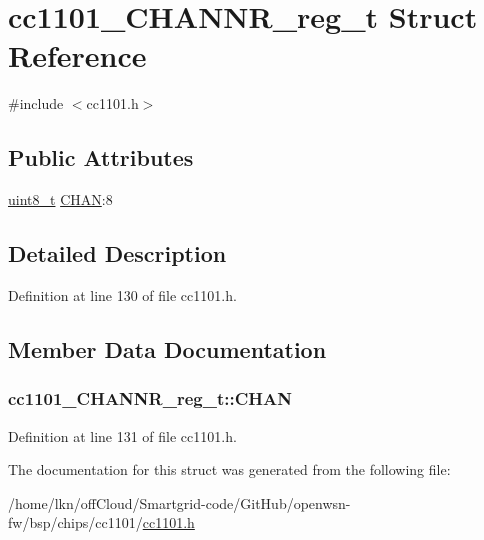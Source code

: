 \hypertarget{structcc1101___c_h_a_n_n_r__reg__t}{}\section{cc1101\+\_\+\+C\+H\+A\+N\+N\+R\+\_\+reg\+\_\+t Struct Reference}
\label{structcc1101___c_h_a_n_n_r__reg__t}


{\ttfamily \#include $<$cc1101.\+h$>$}

\subsection*{Public Attributes}
\begin{DoxyCompactItemize}
\item 
\hyperlink{_p_e___types_8h_aba7bc1797add20fe3efdf37ced1182c5}{uint8\+\_\+t} \hyperlink{structcc1101___c_h_a_n_n_r__reg__t_ae05b02fc3268aefa95260845a485399d}{C\+H\+AN}\+:8
\end{DoxyCompactItemize}


\subsection{Detailed Description}


Definition at line 130 of file cc1101.\+h.



\subsection{Member Data Documentation}
\subsubsection[{\texorpdfstring{C\+H\+AN}{CHAN}}]{ cc1101\+\_\+\+C\+H\+A\+N\+N\+R\+\_\+reg\+\_\+t\+::\+C\+H\+AN}\hypertarget{structcc1101___c_h_a_n_n_r__reg__t_ae05b02fc3268aefa95260845a485399d}{}\label{structcc1101___c_h_a_n_n_r__reg__t_ae05b02fc3268aefa95260845a485399d}


Definition at line 131 of file cc1101.\+h.



The documentation for this struct was generated from the following file\+:\begin{DoxyCompactItemize}
\item 
/home/lkn/off\+Cloud/\+Smartgrid-\/code/\+Git\+Hub/openwsn-\/fw/bsp/chips/cc1101/\hyperlink{cc1101_8h}{cc1101.\+h}\end{DoxyCompactItemize}
